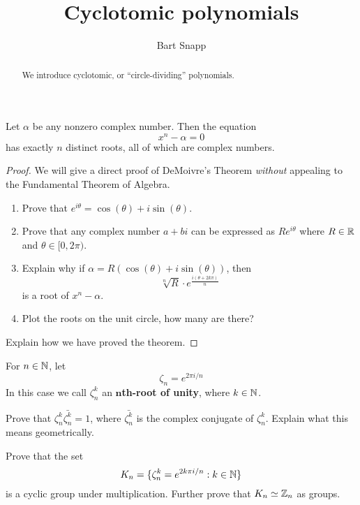 \documentclass{ximera}
\author{Bart Snapp}
\title{Cyclotomic polynomials}
\begin{document}
\begin{abstract}
  We introduce cyclotomic, or ``circle-dividing'' polynomials.
\end{abstract}
\maketitle

\begin{theorem} 
Let $\alpha$ be any nonzero complex number. Then the equation
\[
x^n - \alpha = 0
\]
has exactly $n$ distinct roots, all of which are complex numbers.
\begin{proof} 
We will give a direct proof of DeMoivre's Theorem \textit{without}
appealing to the Fundamental Theorem of Algebra.
\begin{enumerate}
\item Prove that $e^{i \theta} = \cos(\theta) + i \sin(\theta)$.
\item Prove that any complex number $a + bi$ can be expressed as $R
  e^{i\theta}$ where $R\in \mathbb R$ and $\theta \in [0,2\pi)$.
\item Explain why if $\alpha = R(\cos(\theta) +i \sin(\theta))$, then 
\[
\sqrt[n]{R} \cdot  e^{\frac{i(\theta + 2k\pi)}{n}}
\]
is a root of $x^n - \alpha$.
\item Plot the roots on the unit circle, how many are there?
\end{enumerate}
Explain how we have proved the theorem.
\end{proof}
\end{theorem}


\begin{definition} 
For $n\in \mathbb N$, let 
\[
\zeta_n = e^{2\pi i/n}
\]
In this case we call $\zeta_n^k$ an \textbf{$\boldsymbol{n}$th-root of unity}, where $k\in
\mathbb N$.
\end{definition}

\begin{exercise} 
Prove that $\zeta_n^k\bar{\zeta_n^k} = 1$, where $\bar{\zeta_n^k}$ is
the complex conjugate of $\zeta_n^k$. Explain what this means
geometrically.
\end{exercise}

\begin{exercise}\label{E:KN} Prove that the set 
\[
K_n = \{\zeta_n^k = e^{2k\pi i/n}: k\in \mathbb N\}
\]
is a cyclic group under multiplication. Further prove that $K_n \simeq
\mathbb Z_n$ as groups.
\end{exercise}
\end{document}
